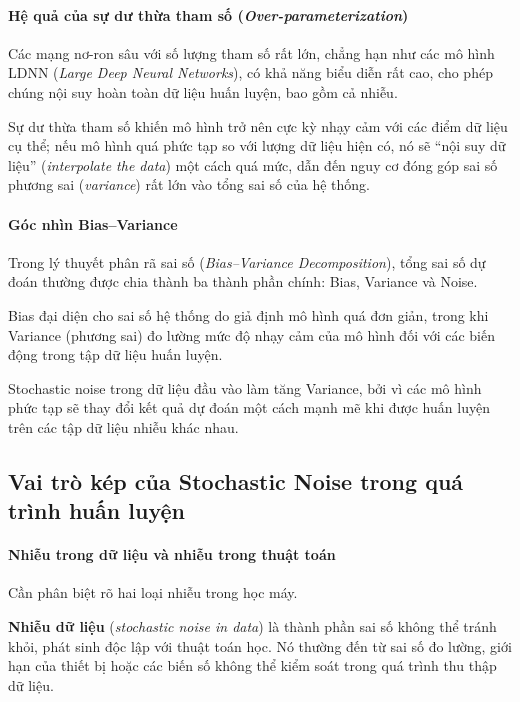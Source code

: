\paragraph{Hệ quả của sự dư thừa tham số (\textit{Over-parameterization})}

Các mạng nơ-ron sâu với số lượng tham số rất lớn, chẳng hạn như các mô hình LDNN (\textit{Large Deep Neural Networks}), có khả năng biểu diễn rất cao, cho phép chúng nội suy hoàn toàn dữ liệu huấn luyện, bao gồm cả nhiễu.

Sự dư thừa tham số khiến mô hình trở nên cực kỳ nhạy cảm với các điểm dữ liệu cụ thể; nếu mô hình quá phức tạp so với lượng dữ liệu hiện có, nó sẽ ``nội suy dữ liệu'' (\textit{interpolate the data}) \cite{Geman_1992} một cách quá mức, dẫn đến nguy cơ đóng góp sai số phương sai (\textit{variance}) rất lớn vào tổng sai số của hệ thống.

\paragraph{Góc nhìn Bias--Variance}

Trong lý thuyết phân rã sai số (\textit{Bias--Variance Decomposition})\cite{Domingos}, tổng sai số dự đoán thường được chia thành ba thành phần chính: Bias, Variance và Noise.

Bias đại diện cho sai số hệ thống do giả định mô hình quá đơn giản, trong khi Variance (phương sai) đo lường mức độ nhạy cảm của mô hình đối với các biến động trong tập dữ liệu huấn luyện.

Stochastic noise trong dữ liệu đầu vào làm tăng Variance, bởi vì các mô hình phức tạp sẽ thay đổi kết quả dự đoán một cách mạnh mẽ khi được huấn luyện trên các tập dữ liệu nhiễu khác nhau.

\subsection{Vai trò kép của Stochastic Noise trong quá trình huấn luyện}

\paragraph{Nhiễu trong dữ liệu và nhiễu trong thuật toán}

Cần phân biệt rõ hai loại nhiễu trong học máy.

\textbf{Nhiễu dữ liệu} (\textit{stochastic noise in data}) là thành phần sai số không thể tránh khỏi, phát sinh độc lập với thuật toán học. Nó thường đến từ sai số đo lường, giới hạn của thiết bị hoặc các biến số không thể kiểm soát trong quá trình thu thập dữ liệu.

